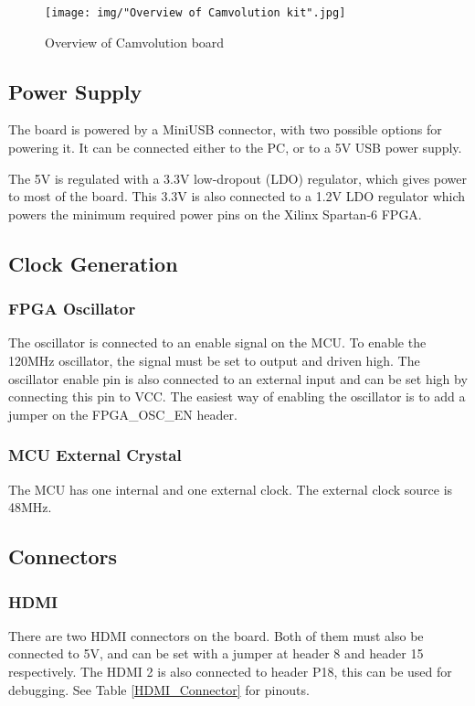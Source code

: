 \begin{figure}
    \texttt{[image: img/"Overview of Camvolution kit".jpg]}
    \caption{Overview of Camvolution board}
    \label{fig:BoardLayout}
\end{figure}

\subsection{Power Supply}
The board is powered by a MiniUSB connector, with two possible options for powering it.
It can be connected either to the PC, or to a 5V USB power supply.

The 5V is regulated with a 3.3V low-dropout (LDO) regulator, which gives power to most of the board.
This 3.3V is also connected to a 1.2V LDO regulator which powers the minimum required power pins on the Xilinx Spartan-6 FPGA.

\subsection{Clock Generation}
\subsubsection{FPGA Oscillator}
The oscillator is connected to an enable signal on the MCU.
To enable the 120MHz oscillator, the signal must be set to output and driven high.
The oscillator enable pin is also connected to an external input and can be set high by connecting this pin to VCC.
The easiest way of enabling the oscillator is to add a jumper on the FPGA\_OSC\_EN header.

\subsubsection{MCU External Crystal}
The MCU has one internal and one external clock.
The external clock source is 48MHz.

\subsection{Connectors}
\subsubsection{HDMI}
There are two HDMI connectors on the board.
Both of them must also be connected to 5V, and can be set with a jumper at header 8 and header 15 respectively.
The HDMI 2 is also connected to header P18, this can be used for debugging.
See Table \ref{HDMI_Connector} for pinouts.

